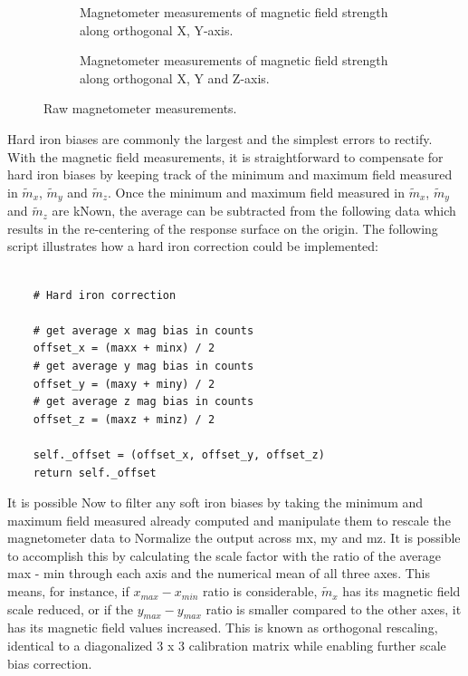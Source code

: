 \begin{figure}[!h]
    \centering
    \begin{subfigure}{0.7\textwidth}
        \centering
        \resizebox{1\linewidth}{!}{}
        \caption{Magnetometer measurements of magnetic field strength along orthogonal X, Y-axis.}
        \label{plt:raw_magnetometer}
    \end{subfigure}

    \begin{subfigure}{0.7\textwidth}
        \centering
        \resizebox{1\linewidth}{!}{}
        \caption{Magnetometer measurements of magnetic field strength along orthogonal X, Y and Z-axis.}
        \label{plt:raw_magnetometer3D}
    \end{subfigure}
    \caption{Raw magnetometer measurements.}
\end{figure}

Hard iron biases are commonly the largest and the simplest errors to rectify. With the magnetic field measurements, it is straightforward to compensate for hard iron biases by keeping track of the minimum and maximum field measured in $\widetilde{m}_x$, $\widetilde{m}_y$ and $\widetilde{m}_z$. Once the minimum and maximum field measured in $\widetilde{m}_x$, $\widetilde{m}_y$ and $\widetilde{m}_z$ are kNown, the average can be subtracted from the following data which results in the re-centering of the response surface on the origin. The following script illustrates how a hard iron correction could be implemented:

\lstset{language=Python}
\begin{lstlisting}[frame=single]  % Start your code-block

    # Hard iron correction

    # get average x mag bias in counts
    offset_x = (maxx + minx) / 2
    # get average y mag bias in counts
    offset_y = (maxy + miny) / 2
    # get average z mag bias in counts
    offset_z = (maxz + minz) / 2

    self._offset = (offset_x, offset_y, offset_z)
    return self._offset
\end{lstlisting}

It is possible Now to filter any soft iron biases by taking the minimum and maximum field measured already computed and manipulate them to rescale the magnetometer data to Normalize the output across mx, my and mz. It is possible to accomplish this by calculating the scale factor with the ratio of the average max - min through each axis and the numerical mean of all three axes. This means, for instance, if $x_{max} - x_{min}$ ratio is considerable, $\widetilde{m}_x$ has its magnetic field scale reduced, or if the $y_{max} - y_{max}$ ratio is smaller compared to the other axes, it has its magnetic field values increased. This is known as orthogonal rescaling, identical to a diagonalized 3 x 3 calibration matrix while enabling further scale bias correction.

